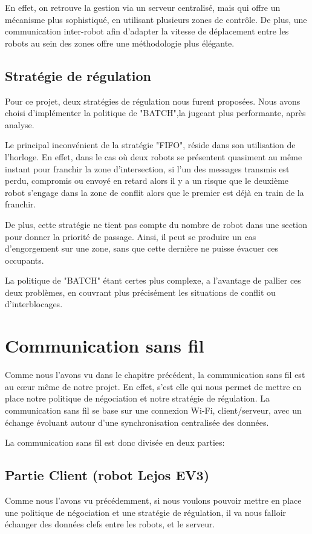 \documentclass[french,a4paper,12pt]{report}
\begin{document}
En effet, on retrouve la gestion via un serveur centralisé, mais qui offre un mécanisme plus sophistiqué, en utilisant plusieurs zones de contrôle. De plus, une communication inter-robot afin d'adapter la vitesse de déplacement entre les robots au sein des zones offre une méthodologie plus élégante.

\section{Stratégie de régulation}
Pour ce projet, deux stratégies de régulation nous furent proposées.
Nous avons choisi d'implémenter la politique de "BATCH",la jugeant plus performante, après analyse.

Le principal inconvénient de la stratégie "FIFO", réside dans son utilisation de l'horloge.
En effet, dans le cas où deux robots se présentent quasiment au même instant pour franchir la zone d'intersection, si l'un des messages transmis est perdu, compromis ou envoyé en retard alors il y a un risque que le deuxième robot s'engage dans la zone de conflit alors que le premier est déjà en train de la franchir.

De plus, cette stratégie ne tient pas compte du nombre de robot dans une section pour donner la priorité de passage. Ainsi, il peut se produire un cas d'engorgement sur une zone, sans que cette dernière ne puisse évacuer ces occupants.

La politique de "BATCH" étant certes plus complexe, a l'avantage de pallier ces deux problèmes, en couvrant plus précisément les situations de conflit ou d'interblocages.

\chapter{Communication sans fil}
Comme nous l'avons vu dans le chapitre précédent, la communication sans fil est au cœur même de notre projet. En effet, s'est elle qui nous permet de mettre en place notre politique de négociation et notre stratégie de régulation.
La communication sans fil se base sur une connexion Wi-Fi, client/serveur, avec un échange évoluant autour d'une synchronisation centralisée des données.

La communication sans fil est donc divisée en deux parties:

\section{Partie Client (robot Lejos EV3)}%
Comme nous l'avons vu précédemment, si nous voulons pouvoir mettre en place une politique de négociation et une stratégie de régulation, il va nous falloir échanger des données clefs entre les robots, et le serveur.
\end{document}
